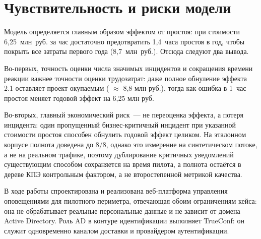 \documentclass[utf8x, 12pt]{G7-32} %
\begin{document}
\section{Чувствительность и риски модели}
Модель определяется главным образом эффектом от простоя: при стоимости
6,25~млн~руб. за час достаточно предотвратить 1,4~часа простоя в год, чтобы
покрыть все затраты первого года (8,7~млн~руб.). Отсюда следуют два вывода.

Во-первых, точность оценки числа значимых инцидентов и сокращения времени
реакции важнее точности оценки трудозатрат: даже полное обнуление эффекта 2.1
оставляет проект окупаемым ( $\approx$ 8,8 млн руб.), тогда как ошибка в
1~час простоя меняет годовой эффект на 6,25 млн руб.

Во-вторых, главный экономический риск~--- не переоценка эффекта, а потеря
инцидента: один пропущенный бизнес-критичный инцидент при указанной стоимости
простоя способен обнулить годовой эффект целиком. На эталонном корпусе полнота
доведена до 8/8, однако это измерение на синтетическом потоке, а не на реальном
трафике, поэтому дублирование критичных уведомлений существующим способом
сохраняется на время пилота, а полнота остаётся в дереве КПЭ контрольным
фактором, а не второстепенной метрикой качества.



\frontmatter %


\backmatter %
\Conclusion
В ходе работы спроектирована и реализована веб-платформа управления
оповещениями для пилотного периметра, отвечающая обоим ограничениям кейса:
она не обрабатывает реальные персональные данные и не зависит от домена
Active Directory. Роль AD в контуре идентификации выполняет TrueConf: он
служит одновременно каналом доставки и провайдером аутентификации.
\end{document}
